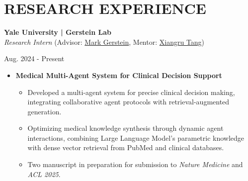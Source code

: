\documentclass[10pt, letterpaper]{article}
\newenvironment{highlights}{
    \begin{itemize}[
        topsep=0.10 cm,
        parsep=0.10 cm,
        partopsep=0pt,
        itemsep=0pt,
        leftmargin=0 cm + 10pt
    ]
}{
    \end{itemize}
} %
\newenvironment{twocolentry}[2][]{
    \onecolentry
    \def\secondColumn{#2}
    \setcolumnwidth{\fill, 3.5 cm}
    \begin{paracol}{2}
}{
    \switchcolumn \raggedleft \secondColumn
    \end{paracol}
    \endonecolentry
} %
\begin{document}
    
\section{RESEARCH EXPERIENCE}
\vspace{0.1 cm}
        \begin{twocolentry}{
            Aug. 2024 - Present\\ 
        }
        \textbf{Yale University | Gerstein Lab} \href{https://www.gersteinlab.org/}{\faExternalLink*}\\
        \textit{Research Intern} (Advisor: \href{https://scholar.google.com/citations?user=YvjuUugAAAAJ&hl=en}{Mark Gerstein}, Mentor: \href{https://scholar.google.com.hk/citations?user=gGcRkpYAAAAJ&hl=en}{Xiangru Tang})
        
        \end{twocolentry}
    \vspace{0.1 cm}
\begin{highlights}
    \item \textbf{Medical Multi-Agent System for Clinical Decision Support}
        \vspace{-0.1 cm}
    \begin{highlights}
        \item Developed a multi-agent system for precise clinical decision making, integrating collaborative agent protocols with retrieval-augmented generation.
        \item Optimizing medical knowledge synthesis through dynamic agent interactions, combining Large Language Model's parametric knowledge with dense vector retrieval from PubMed and clinical databases.
        \item Two manuscript in preparation for submission to \textit{Nature Medicine} and \textit{ACL 2025}.

    \end{highlights}

%
\end{highlights}
\end{document}
